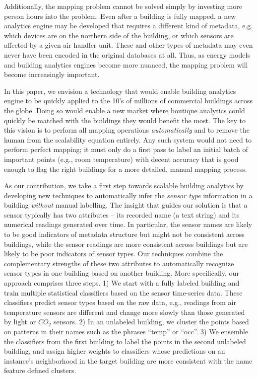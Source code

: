 Additionally, the mapping problem cannot be solved simply by investing more
person hours into the problem. Even after a building is fully mapped, a new
analytics engine may be developed that requires a different kind of metadata,
e.g. which devices are on the northern side of the building, or which sensors
are affected by a given air handler unit. These and other types of metadata may
even never have been encoded in the original databases at all. Thus, as energy
models and building analytics engines become more nuanced, the mapping problem
will become increasingly important.

In this paper, we envision a technology that would enable building analytics
engine to be quickly applied to the 10's of millions of commercial buildings
across the globe. Doing so would enable a new market where boutique analytics
could quickly be matched with the buildings they would benefit the most. The key
to this vision is to perform all mapping operations {\em automatically} and to
remove the human from the scalability equation entirely. Any such system would
not need to perform perfect mapping; it must only do a first pass to label an
initial batch of important points (e.g., room temperature) with decent accuracy
that is good enough to flag the right buildings for a more detailed, manual
mapping process.

As our contribution, we take a first step towards scalable building analytics by
developing new techniques to automatically infer the {\it sensor type}
information in a building {\em without} manual labelling. The insight that
guides our solution is that a sensor typically has two attributes -- its
recorded name (a text string) and its numerical readings generated over time. In
particular, the sensor names are likely to be good indicators of metadata
structure but might not be consistent across buildings, while the sensor
readings are more consistent across buildings but are likely to be poor
indicators of sensor types. Our techniques combine the complementary strengths
of these two attributes to automatically recognize sensor types in one building
based on another building. More specifically, our approach comprises three
steps. 1) We start with a fully labeled building and train multiple statistical
classifiers based on the sensor time-series data. These classifiers predict
sensor types based on the raw data, e.g., readings from air temperature sensors
are different and change more slowly than those generated by light or $CO_2$
sensors. 2) In an unlabeled building, we cluster the points based on patterns in
their names such as the phrases ``temp'' or ``occ''. 3) We ensemble the
classifiers from the first building to label the points in the second unlabeled
building, and assign higher weights to classifiers whose predictions on an
instance's neighborhood in the target building are more consistent with the name
feature defined clusters. 

